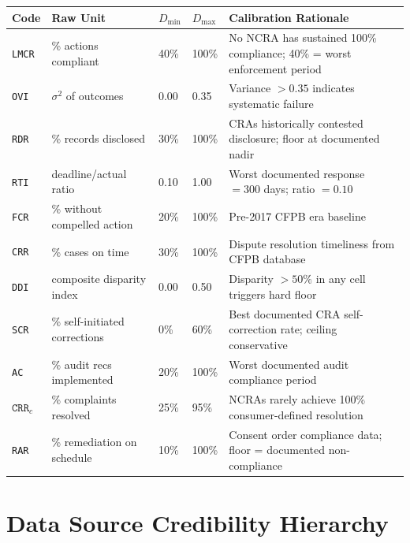 \documentclass[a4paper,11pt]{article}
\begin{document}
	\begin{center}
		\begin{tabular}{L{1.8cm} L{2.7cm} C{1.8cm} C{2.0cm} L{5.0cm}}
			\toprule
			\color{white}\textbf{\sffamily Code} & \color{white}\textbf{\sffamily Raw Unit} & \color{white}\textbf{\sffamily $D_{\min}$} & \color{white}\textbf{\sffamily $D_{\max}$} & \color{white}\textbf{\sffamily Calibration Rationale} \\
			\midrule
			\texttt{LMCR} & \% actions compliant & 40\% & 100\% & No NCRA has sustained 100\% compliance; 40\% = worst enforcement period \\
			\texttt{OVI} & $\sigma^2$ of outcomes & 0.00 & 0.35 & Variance $> 0.35$ indicates systematic failure \\
			\texttt{RDR} & \% records disclosed & 30\% & 100\% & CRAs historically contested disclosure; floor at documented nadir \\
			\texttt{RTI} & deadline/actual ratio & 0.10 & 1.00 & Worst documented response $= 300$ days; ratio $= 0.10$ \\
			\texttt{FCR} & \% without compelled action & 20\% & 100\% & Pre-2017 CFPB era baseline \\
			\texttt{CRR} & \% cases on time & 30\% & 100\% & Dispute resolution timeliness from CFPB database \\
			\texttt{DDI} & composite disparity index & 0.00 & 0.50 & Disparity $> 50\%$ in any cell triggers hard floor \\
			\texttt{SCR} & \% self-initiated corrections & 0\% & 60\% & Best documented CRA self-correction rate; ceiling conservative \\
			\texttt{AC} & \% audit recs implemented & 20\% & 100\% & Worst documented audit compliance period \\
			$\texttt{CRR}_c$ & \% complaints resolved & 25\% & 95\% & NCRAs rarely achieve 100\% consumer-defined resolution \\
			\texttt{RAR} & \% remediation on schedule & 10\% & 100\% & Consent order compliance data; floor = documented non-compliance \\
			\bottomrule
		\end{tabular}
	\end{center}
	
	\section{Data Source Credibility Hierarchy}
	
\end{document}
